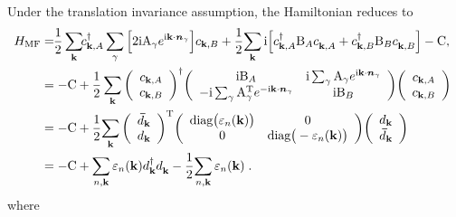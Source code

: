 Under the translation invariance assumption, the Hamiltonian reduces to
\begin{align}
    \!\!H_{\mathrm{MF}}
    &=\!\!
    \frac{1}{2}\sum_{\mathbf{k}} \!\!  c_{\mathbf{k},A}^{\dagger}  \sum_{\gamma} \Big[2\im \rmA_{\gamma} e^{\im \mathbf{k}\cdot \bm{n}_\gamma} \Big]  c_{\mathbf{k},B}  +\frac{1}{2}
    \!\sum_{\mathbf{k}}\im\Big[ c_{\mathbf{k},A}^{\dagger}\rmB_{A} c_{\mathbf{k},A}^\pd
    +c_{\mathbf{k},B}^{\dagger}  \rmB_{B} c_{\mathbf{k},B}^\pd \Big] -
    \rmC ,  \\
    &=-      \rmC  + \frac{1}{2}
    \sum_{\mathbf{k}}
    \left(\begin{array}{c} c_{\mathbf{k},A} \\ c_{\mathbf{k},B}
    \end{array}\right)^{\dagger}  \!
    \left(\begin{array}{cc}
         \im \rmB_{A} & \im \sum_{\gamma} \rmA_{\gamma} e^{\im \mathbf{k}\cdot \bm{n}_\gamma}  \\
         -\im \sum_{\gamma} \rmA_{\gamma}^{\T} e^{-\im \mathbf{k}\cdot \bm{n}_\gamma} & \im \rmB_{B}
    \end{array}\right)\!
    \left(\begin{array}{c} c_{\mathbf{k},A} \\ c_{\mathbf{k},B}
    \end{array}\right) \\
    &=-      \rmC  + \frac{1}{2} \!
    \sum_{\mathbf{k}}
    \left(\begin{array}{c} \bar{d}_{\mathbf{k}} \\ d_{\mathbf{k}}
    \end{array}\right)^{\T}  \!
    \left(\begin{array}{cc}
         \text{diag}\big(\varepsilon_n(\mathbf{k}) \big) & 0\\
         0& \text{diag}\big(-\varepsilon_n(\mathbf{k}) \big)
    \end{array}\right)\!
    \left(\begin{array}{c} d_{\mathbf{k}} \\ \bar{d}_{\mathbf{k}}
    \end{array}\right)\\
    &= -\rmC + \sum_{n, \mathbf{k}} \varepsilon_n(\mathbf{k}) d_{\mathbf{k}}^\dagger d_{\mathbf{k}}^\pd -\frac{1}{2}\!   \sum_{n, \mathbf{k}} \varepsilon_n(\mathbf{k}) \; .
\end{align}
where
